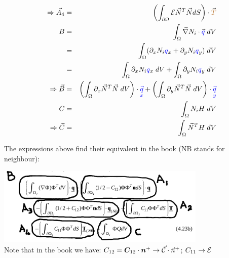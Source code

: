 \begin{eqnarray}
\Rightarrow {\vec A}_4 &=&  \left( \int_{\partial\Omega}   {\cal{E}}   \vec{N}^T \vec{N} dS \right) \cdot \vec{{\color{brown} T}} \\ 
B 
&=& \int_{\Omega} \vec{\nabla} {N_i} \cdot \vec{\color{blue} q} \; dV  \nonumber \\
&=& \int_{\Omega} (\partial_x N_i {\color{blue}q}_x + \partial_y N_i {\color{blue}q}_y )   \; dV  \nonumber \\
&=& \int_{\Omega} \partial_x N_i {\color{blue}q}_x   \; dV   
 +  \int_{\Omega} \partial_y N_i {\color{blue}q}_y   \; dV  \nonumber \\
\Rightarrow {\vec B} &=& 
  \left(\int_{\Omega} \partial_x \vec{N}^T \vec{N}   \; dV \right)\cdot {\color{blue}\vec{\underset{\tiny x}{q}}}  
+ \left(\int_{\Omega} \partial_y \vec{N}^T \vec{N}   \; dV \right)\cdot {\color{blue}\vec{\underset{\tiny y}{q}}}  \\
C &=& \int_{\Omega} {N_i} H  \;dV \nonumber \\
\Rightarrow {\vec C} &=& \int_{\Omega} \vec{N}^T H  \;dV  
\end{eqnarray}


The expressions above find their equivalent in the book (NB stands for neighbour):
\begin{center}
\includegraphics[width=10cm]{images/dgfem/li_01}\\
{\captionfont Note that in the book we have: $C_{12}={\bm C}_{12}\cdot {\bm n}^+ \rightarrow \vec{\cal C}\cdot\vec{n}^+$;
$C_{11} \rightarrow {\cal E}$}
\end{center}





